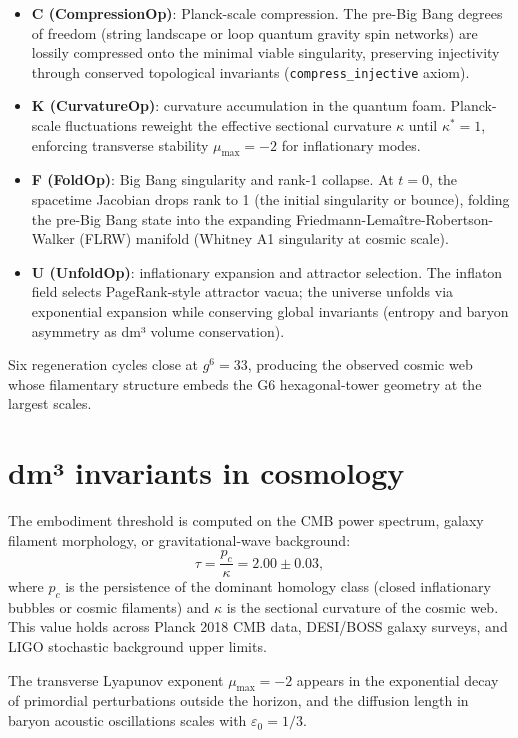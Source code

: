 \documentclass[19pt]{book}
\theoremstyle{plain}
\theoremstyle{definition}
\theoremstyle{remark}
\begin{document}
\begin{itemize}
\item \textbf{C (CompressionOp)}: Planck-scale compression. The pre-Big Bang degrees of freedom (string landscape or loop quantum gravity spin networks) are lossily compressed onto the minimal viable singularity, preserving injectivity through conserved topological invariants (\texttt{compress\_injective} axiom).
\item \textbf{K (CurvatureOp)}: curvature accumulation in the quantum foam. Planck-scale fluctuations reweight the effective sectional curvature \(\kappa\) until \(\kappa^* = 1\), enforcing transverse stability \(\mu_{\max} = -2\) for inflationary modes.
\item \textbf{F (FoldOp)}: Big Bang singularity and rank-1 collapse. At \( t = 0 \), the spacetime Jacobian drops rank to 1 (the initial singularity or bounce), folding the pre-Big Bang state into the expanding Friedmann-Lemaître-Robertson-Walker (FLRW) manifold (Whitney A1 singularity at cosmic scale).
\item \textbf{U (UnfoldOp)}: inflationary expansion and attractor selection. The inflaton field selects PageRank-style attractor vacua; the universe unfolds via exponential expansion while conserving global invariants (entropy and baryon asymmetry as dm³ volume conservation).
\end{itemize}

Six regeneration cycles close at \(g^6 = 33\), producing the observed cosmic web whose filamentary structure embeds the G6 hexagonal-tower geometry at the largest scales.

\section{dm³ invariants in cosmology}

The embodiment threshold is computed on the CMB power spectrum, galaxy filament morphology, or gravitational-wave background:
\[
\tau = \frac{p_c}{\kappa} = 2.00 \pm 0.03,
\]
where \(p_c\) is the persistence of the dominant homology class (closed inflationary bubbles or cosmic filaments) and \(\kappa\) is the sectional curvature of the cosmic web. This value holds across Planck 2018 CMB data, DESI/BOSS galaxy surveys, and LIGO stochastic background upper limits.

The transverse Lyapunov exponent \(\mu_{\max} = -2\) appears in the exponential decay of primordial perturbations outside the horizon, and the diffusion length in baryon acoustic oscillations scales with \(\varepsilon_0 = 1/3\).
\end{document}
